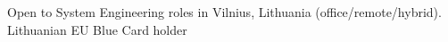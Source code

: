 \documentclass[letter,10pt]{article}
\begin{document}
Open to System Engineering roles in Vilnius, Lithuania (office/remote/hybrid). Lithuanian EU Blue Card holder\\
\end{document}
